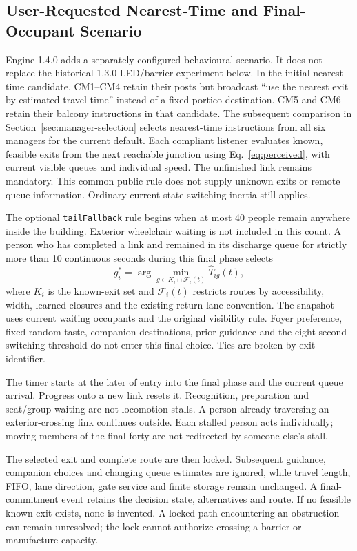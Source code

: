 \subsection{User-Requested Nearest-Time and Final-Occupant Scenario}\label{sec:tail-policy}

Engine 1.4.0 adds a separately configured behavioural scenario. It does not replace the historical 1.3.0 LED/barrier experiment below. In the initial nearest-time candidate, CM1--CM4 retain their posts but broadcast ``use the nearest exit by estimated travel time'' instead of a fixed portico destination. CM5 and CM6 retain their balcony instructions in that candidate. The subsequent comparison in Section~\ref{sec:manager-selection} selects nearest-time instructions from all six managers for the current default. Each compliant listener evaluates known, feasible exits from the next reachable junction using Eq.~\eqref{eq:perceived}, with current visible queues and individual speed. The unfinished link remains mandatory. This common public rule does not supply unknown exits or remote queue information. Ordinary current-state switching inertia still applies.

The optional \texttt{tailFallback} rule begins when at most 40 people remain anywhere inside the building. Exterior wheelchair waiting is not included in this count. A person who has completed a link and remained in its discharge queue for strictly more than 10 continuous seconds during this final phase selects
\[
g_i^*=\arg\min_{g\in K_i\cap\mathcal F_i(t)}\widehat T_{ig}(t),
\]
where $K_i$ is the known-exit set and $\mathcal F_i(t)$ restricts routes by accessibility, width, learned closures and the existing return-lane convention. The snapshot uses current waiting occupants and the original visibility rule. Foyer preference, fixed random taste, companion destinations, prior guidance and the eight-second switching threshold do not enter this final choice. Ties are broken by exit identifier.

The timer starts at the later of entry into the final phase and the current queue arrival. Progress onto a new link resets it. Recognition, preparation and seat/group waiting are not locomotion stalls. A person already traversing an exterior-crossing link continues outside. Each stalled person acts individually; moving members of the final forty are not redirected by someone else's stall.

The selected exit and complete route are then locked. Subsequent guidance, companion choices and changing queue estimates are ignored, while travel length, FIFO, lane direction, gate service and finite storage remain unchanged. A final-commitment event retains the decision state, alternatives and route. If no feasible known exit exists, none is invented. A locked path encountering an obstruction can remain unresolved; the lock cannot authorize crossing a barrier or manufacture capacity.

